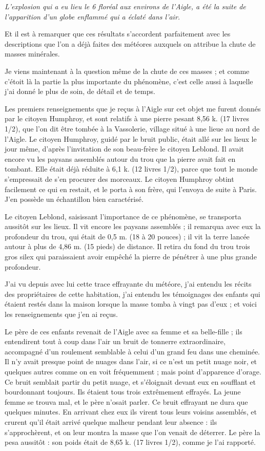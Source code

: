 \documentclass[a4paper, 11pt, oneside, polutonikogreek, french]{article}
\begin{document}
\emph{L'explosion qui a eu lieu le 6 floréal aux environs de l'Aigle, a été la suite de l'apparition d'un globe enflammé qui a éclaté dans l'air.}

Et il est à remarquer que ces résultats s'accordent parfaitement avec les descriptions que l'on a déjà faites des météores auxquels on attribue la chute de masses minérales.

Je viens maintenant à la question même de la chute de ces masses ; et comme c'étoit là la partie la plus importante du phénomène, c'est celle aussi à laquelle j'ai donné le plus de soin, de détail et de temps.

Les premiers renseignements que je reçus à l'Aigle sur cet objet me furent donnés par le citoyen Humphroy, et sont relatifs à une pierre pesant 8,56 k. (17 livres 1/2), que l'on dit être tombée à la Vassolerie, village situé à une lieue au nord de l'Aigle. Le citoyen Humphroy, guidé par le bruit public, était allé sur les lieux le jour même, d'après l'invitation de son beau-frère le citoyen Leblond. Il avait encore vu les paysans assemblés autour du trou que la pierre avait fait en tombant. Elle était déjà réduite à 6,1 k. (12 livres 1/2), parce que tout le monde s'empressait de s'en procurer des morceaux. Le citoyen Humphroy obtint facilement ce qui en restait, et le porta à son frère, qui l'envoya de suite à Paris. J'en possède un échantillon bien caractérisé.

Le citoyen Leblond, saisissant l'importance de ce phénomène, se transporta aussitôt sur les lieux. Il vit encore les paysans assemblés ; il remarqua avec eux la profondeur du trou, qui était de 0,5 m. (18 à 20 pouces) ; il vit la terre lancée autour à plus de 4,86 m. (15 pieds) de distance. Il retira du fond du trou trois gros silex qui paraissaient avoir empêché la pierre de pénétrer à une plus grande profondeur.

J'ai vu depuis avec lui cette trace effrayante du météore, j'ai entendu les récits des propriétaires de cette habitation, j'ai entendu les témoignages des enfants qui étaient restés dans la maison lorsque la masse tomba à vingt pas d'eux ; et voici les renseignements que j'en ai reçus.

Le père de ces enfants revenait de l'Aigle avec sa femme et sa belle-fille ; ils entendirent tout à coup dans l'air un bruit de tonnerre extraordinaire, accompagné d'un roulement semblable à celui d'un grand feu dans une cheminée. Il n'y avait presque point de nuages dans l'air, si ce n'est un petit nuage noir, et quelques autres comme on en voit fréquemment ; mais point d'apparence d'orage. Ce bruit semblait partir du petit nuage, et s'éloignait devant eux en soufflant et bourdonnant toujours. Ils étaient tous trois extrêmement effrayés. La jeune femme se trouva mal, et le père n'osait parler. Ce bruit effrayant ne dura que quelques minutes. En arrivant chez eux ils virent tous leurs voisins assemblés, et crurent qu'il était arrivé quelque malheur pendant leur absence : ils s'approchèrent, et on leur montra la masse que l'on venait de déterrer. Le père la pesa aussitôt : son poids était de 8,65 k. (17 livres 1/2), comme je l'ai rapporté.
\end{document}
